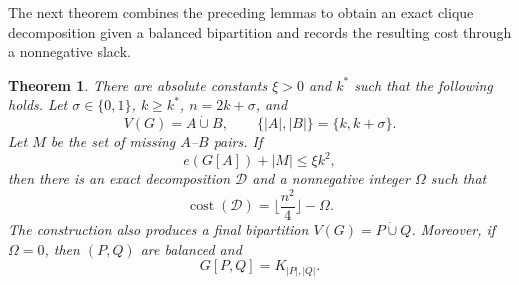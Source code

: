 \documentclass[11pt]{article}
\numberwithin{equation}{section}
\newtheorem{theorem}{Theorem}[section]
\theoremstyle{remark}
\DeclareMathOperator{\cost}{cost}
\newcommand{\dotcupunion}{\mathbin{\dot\cup}}
\begin{document}
The next theorem combines the preceding lemmas to obtain an exact clique decomposition given
a balanced bipartition and records the resulting cost through a nonnegative slack.

\begin{theorem}
\label{dec:thm:stable-decomposition}
There are absolute constants \(\xi>0\) and \(k^\ast\) such that the
following holds.  Let \(\sigma\in\{0,1\}\), \(k\ge k^\ast\), \(n=2k+\sigma\), and
\begin{equation*}
  V(G)=A\dotcupunion B,\qquad
  \{|A|,|B|\}=\{k,k+\sigma\}.
\end{equation*}
Let \(M\) be the set of missing \(A\)--\(B\) pairs. If
\begin{equation*}
  e(G[A])+|M|\le\xi k^2,
\end{equation*}
then there is an exact decomposition \(\mathcal D\) and a nonnegative integer \(\Omega\) such that
\begin{equation}\label{dec:eq:3.36}
 \cost(\mathcal D)=\lfloor \frac{n^2}{4}\rfloor-\Omega.
\end{equation}
The construction also produces a final bipartition \(V(G)=P\dotcupunion Q\).
Moreover, if \(\Omega=0\), then \((P,Q)\) are balanced and
\begin{equation*}
 G[P,Q]=K_{|P|,|Q|}.
\end{equation*}
\end{theorem}
\end{document}
